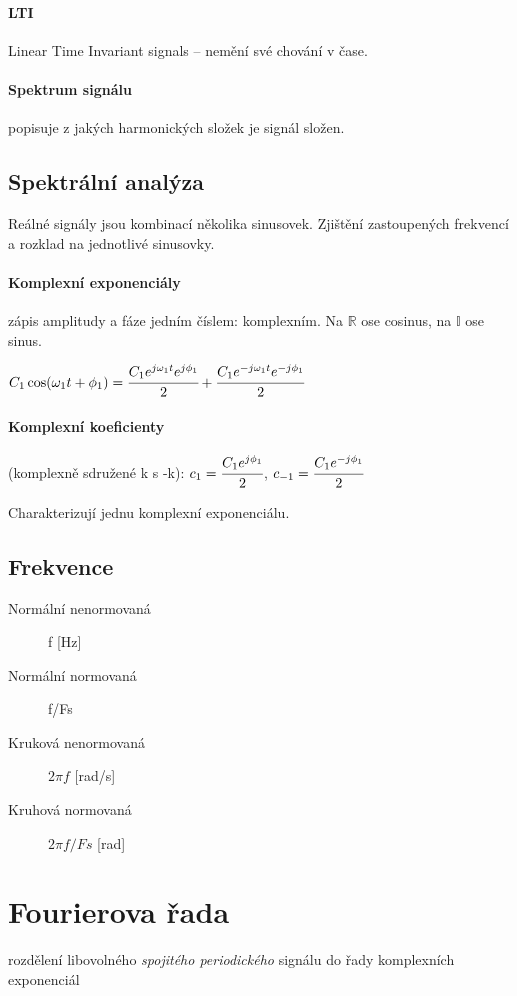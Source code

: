 \documentclass[a4paper, 11pt]{report}
\begin{document}
\paragraph{LTI} Linear Time Invariant signals -- nemění své chování v čase.

\paragraph{Spektrum signálu}
popisuje z jakých harmonických složek je signál složen.

\subsection{Spektrální analýza}
Reálné signály jsou kombinací několika sinusovek. Zjištění zastoupených frekvencí a rozklad na jednotlivé sinusovky.

\paragraph{Komplexní exponenciály}
zápis amplitudy a fáze jedním číslem: komplexním. Na $\mathbb{R}$ ose cosinus, na $\mathbb{I}$ ose sinus.

$C_1 \cos(\omega_1 t + \phi_1) = \cfrac{C_1 e^{j \omega_1 t} e^{j \phi_1}}{2} + \cfrac{C_1 e^{ - j \omega_1 t} e^{ - j \phi_1}}{2}$

\paragraph{Komplexní koeficienty} (komplexně sdružené k s -k): $c_1 = \cfrac{C_1 e^{j \phi_1}}{2}$, $c_{-1} = \cfrac{C_1 e^{ - j \phi_1}}{2}$

Charakterizují jednu komplexní exponenciálu.


\subsection{Frekvence}
\begin{description}
	\item[Normální nenormovaná] f [Hz]
	\item[Normální normovaná] f/Fs
	\item[Kruková nenormovaná] $2 \pi f$ [rad/s]
	\item[Kruhová normovaná] $2 \pi f / Fs$ [rad]
\end{description}


\section{Fourierova řada}
rozdělení libovolného \emph{spojitého periodického} signálu do řady komplexních exponenciál
\end{document}
